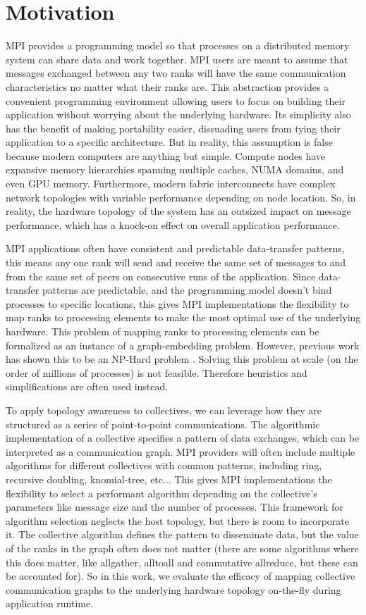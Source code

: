 \section{Motivation}
MPI provides a programming model so that processes on a distributed memory system can share data and work together.
MPI users are meant to assume that messages exchanged between any two ranks will have the same communication characteristics no matter what their ranks are. 
This abstraction provides a convenient programming environment allowing users to focus on building their application without worrying about the underlying hardware. 
Its simplicity also has the benefit of making portability easier, dissuading users from tying their application to a specific architecture.
But in reality, this assumption is false because modern computers are anything but simple. 
Compute nodes have expansive memory hierarchies spanning multiple caches, NUMA domains, and even GPU memory.
Furthermore, modern fabric interconnects have complex network topologies with variable performance depending on node location.
So, in reality, the hardware topology of the system has an outsized impact on message performance, which has a knock-on effect on overall application performance. 

MPI applications often have consistent and predictable data-transfer patterns, this means any one rank will send and receive the same set of messages to and from the same set of peers on consecutive runs of the application.
Since data-transfer patterns are predictable, and the programming model doesn't bind processes to specific locations, this gives MPI implementations the flexibility to map ranks to processing elements to make the most optimal use of the underlying hardware.
This problem of mapping ranks to processing elements can be formalized as an instance of a graph-embedding problem. However, previous work has shown this to be an NP-Hard problem \cite{Hoefler2011GenericTopoMappingStrats}. 
Solving this problem at scale (on the order of millions of processes) is not feasible. Therefore heuristics and simplifications are often used instead.

To apply topology awareness to collectives, we can leverage how they are structured as a series of point-to-point communications.
The algorithmic implementation of a collective specifies a pattern of data exchanges, which can be interpreted as a communication graph.
MPI providers will often include multiple algorithms for different collectives with common patterns, including ring, recursive doubling, knomial-tree, etc...
This gives MPI implementations the flexibility to select a performant algorithm depending on the collective's parameters like message size and the number of processes.
This framework for algorithm selection neglects the host topology, but there is room to incorporate it.
The collective algorithm defines the pattern to disseminate data, but the value of the ranks in the graph often  does not matter (there are some algorithms where this does matter, like allgather, alltoall and commutative allreduce, but these can be accounted for).
So in this work, we evaluate the efficacy of mapping collective communication graphs to the underlying hardware topology on-the-fly during application runtime.

